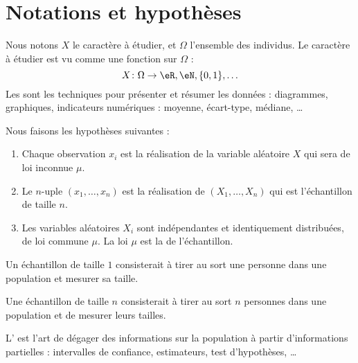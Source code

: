 
\section{Notations et hypothèses}

Nous notons \( X\) le caractère à étudier, et \( \Omega\) l'ensemble des individus. Le caractère à étudier est vu comme une fonction sur \( \Omega\) :
\begin{equation}
	X\colon \Omega\to \eR,\eN,\{ 0,1 \},\ldots
\end{equation}
Les  sont les techniques pour présenter et résumer les données : diagrammes, graphiques, indicateurs numériques : moyenne, écart-type, médiane, \ldots

Nous faisons les hypothèses suivantes :
\begin{enumerate}
	\item
	      Chaque observation \( x_i\) est la réalisation de la variable aléatoire \( X\) qui sera de loi inconnue \( \mu\).
	\item
	      Le \( n\)-uple \( (x_1,\ldots,x_n)\) est la réalisation de \( (X_1,\ldots,X_n)\) qui est l'échantillon de taille \( n\).
	\item
	      Les variables aléatoires \( X_i\) sont indépendantes et identiquement distribuées, de loi commune \( \mu\). La loi \( \mu\) est la  de l'échantillon.
\end{enumerate}

\begin{example}
	Un échantillon de taille \( 1\) consisterait à tirer au sort une personne dans une population et mesurer sa taille.
\end{example}

\begin{example}
	Une échantillon de taille \( n\) consisterait à tirer au sort \( n\) personnes dans une population et de mesurer leurs tailles.
\end{example}

L' est l'art de dégager des informations sur la population à partir d'informations partielles : intervalles de confiance, estimateurs, test d'hypothèses, \ldots

